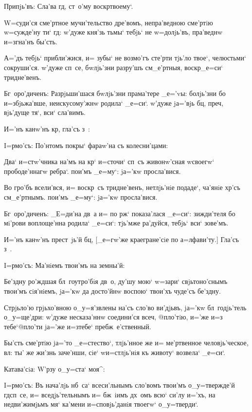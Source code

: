 Припjь'въ: Сла'ва гд, ст~о'му воскр твоему`.

W=суди'ся сме'ртное мучи'тельство дре'вомъ, 
непра'ведною сме'ртiю w=сужде'ну ти` гд: w'дуже 
кня'зь тьмы` тебjь` не w=долjь'въ, пра'веднw и=згна'нъ 
бы'сть.

А='дъ тебjь` прибли'жися, и= зубы` не возмо'гъ сте'рти 
тjь'ло твое`, челюстьми` сокруши'ся. w'дуже сп~се, 
бwлjь'зни разру'шъ см_е'ртныя, воскр _е=си` 
тридне'венъ.

Бг~оро'диченъ: Разрjьши'шася бwлjь'зни прама'тере 
_е='vы: болjь'зни бо и=збjьжа'вше, неискусому'жнw родила` 
_е=си`. w'дуже jа='вjь бц, преч, вjь'дуще 
тя`, вси` сла'вимъ.

И='нъ канw'нъ кр, гла'съ з~:


I=рмо'съ: По'нтомъ покры` фараw'на съ колесни'цами:

Два` и=стw'чника на'мъ на кр` и=сточи` сп~съ 
живонw'сная w\т своегw` прободе'ннагw ребра`. пои'мъ 
_е=му`: jа='кw просла'вися.

Во гро'бъ всели'вся, и= воскр~съ тридне'венъ, 
нетлjь'нiе подаде`, ча'янiе хр'съ см_е'ртнымъ. пои'мъ 
_е=му`: jа='кw просла'вися.

Бг~оро'диченъ: _Е=ди'на дв~а и= по рж` 
показа'лася _е=си`: зижди'теля бо мi'рови воплоще'нна 
родила` _е=си`: тjь'мже ра'дуйся, тебjь` вси` зове'мъ.

И='нъ канw'нъ прест~jь'й бц, [_е=гw'же 
краегране'сiе по а=лфави'ту.] Гла'съ з~.

I=рмо'съ: Ма'нiемъ твои'мъ на земны'й:

Бе'здну ро'ждшая бл~гоутро'бiя дв~о, ду'шу мою` 
w=зари` свjьтоно'снымъ твои'мъ сiя'нiемъ, jа='кw да 
досто'йнw воспою` твои'хъ чуде'съ бе'здну.

Стрjьло'ю грjьхо'вною о_у=я'звлены на'съ сло'во 
ви'дjьвъ, jа='кw бл~годjь'тель о_у=ще'дри: w'дуже 
несказа'ннw соедини'ся всеч, @пло'тiю, и='же и=з\ъ 
тебе`@{пло'ти jа='же и=з\ъ тебе`} пребж~е'ственный.

Бы'сть сме'ртiю jа='то _е=стество`, тлjь'нное же и= 
ме'ртвенное человjь'ческое, вл: ты' же жи'знь 
заче'нши, сiе` w\т и=стлjь'нiя къ животу` возвела` 
_е=си`.

Катава'сiа: W'рзу о_у=ста` моя^:


I=рмо'съ: Въ нача'лjь нб~са` всеси'льнымъ сло'вомъ 
твои'мъ о_у=твержде'й гд сп~се, и= вседjь'тельнымъ и= 
бж~iимъ дх~омъ всю` си'лу и='хъ, на недви'жимjьмъ мя` 
ка'мени и=сповjь'данiя твоегw` о_у=тверди`.

